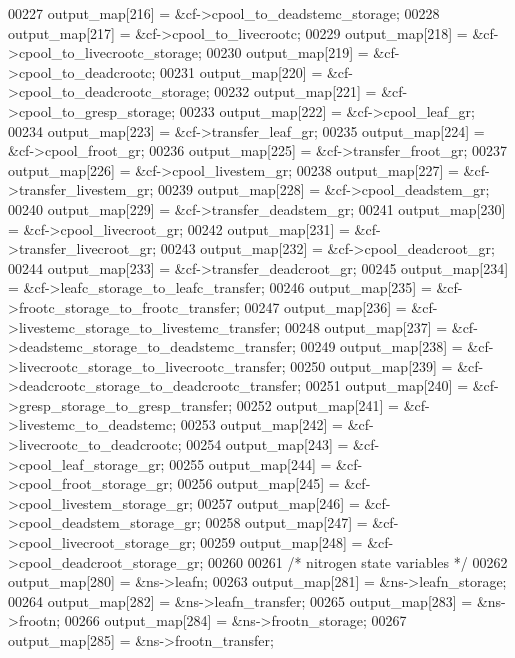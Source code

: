 \begin{DoxyCode}
00227         output\_map[216] = &cf->cpool\_to\_deadstemc\_storage;
00228         output\_map[217] = &cf->cpool\_to\_livecrootc;
00229         output\_map[218] = &cf->cpool\_to\_livecrootc\_storage;
00230         output\_map[219] = &cf->cpool\_to\_deadcrootc;
00231         output\_map[220] = &cf->cpool\_to\_deadcrootc\_storage;
00232         output\_map[221] = &cf->cpool\_to\_gresp\_storage;
00233         output\_map[222] = &cf->cpool\_leaf\_gr;
00234         output\_map[223] = &cf->transfer\_leaf\_gr;
00235         output\_map[224] = &cf->cpool\_froot\_gr;
00236         output\_map[225] = &cf->transfer\_froot\_gr;
00237         output\_map[226] = &cf->cpool\_livestem\_gr;
00238         output\_map[227] = &cf->transfer\_livestem\_gr;
00239         output\_map[228] = &cf->cpool\_deadstem\_gr;
00240         output\_map[229] = &cf->transfer\_deadstem\_gr;
00241         output\_map[230] = &cf->cpool\_livecroot\_gr;
00242         output\_map[231] = &cf->transfer\_livecroot\_gr;
00243         output\_map[232] = &cf->cpool\_deadcroot\_gr;
00244         output\_map[233] = &cf->transfer\_deadcroot\_gr;
00245         output\_map[234] = &cf->leafc\_storage\_to\_leafc\_transfer;
00246         output\_map[235] = &cf->frootc\_storage\_to\_frootc\_transfer;
00247         output\_map[236] = &cf->livestemc\_storage\_to\_livestemc\_transfer;
00248         output\_map[237] = &cf->deadstemc\_storage\_to\_deadstemc\_transfer;
00249         output\_map[238] = &cf->livecrootc\_storage\_to\_livecrootc\_transfer;
00250         output\_map[239] = &cf->deadcrootc\_storage\_to\_deadcrootc\_transfer;
00251         output\_map[240] = &cf->gresp\_storage\_to\_gresp\_transfer;
00252         output\_map[241] = &cf->livestemc\_to\_deadstemc;
00253         output\_map[242] = &cf->livecrootc\_to\_deadcrootc;
00254         output\_map[243] = &cf->cpool\_leaf\_storage\_gr;
00255         output\_map[244] = &cf->cpool\_froot\_storage\_gr;
00256         output\_map[245] = &cf->cpool\_livestem\_storage\_gr;
00257         output\_map[246] = &cf->cpool\_deadstem\_storage\_gr;
00258         output\_map[247] = &cf->cpool\_livecroot\_storage\_gr;
00259         output\_map[248] = &cf->cpool\_deadcroot\_storage\_gr;
00260         
00261         \textcolor{comment}{/* nitrogen state variables */}
00262         output\_map[280] = &ns->leafn;
00263         output\_map[281] = &ns->leafn\_storage;
00264         output\_map[282] = &ns->leafn\_transfer;
00265         output\_map[283] = &ns->frootn;
00266         output\_map[284] = &ns->frootn\_storage;
00267         output\_map[285] = &ns->frootn\_transfer;

\end{DoxyCode}
